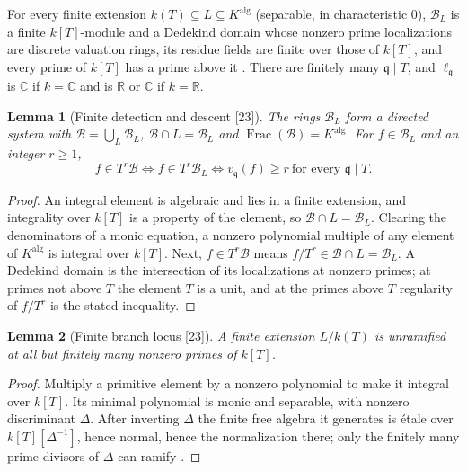 \documentclass[11pt,letterpaper]{article}
\numberwithin{equation}{section}
\newtheorem{lemma}[lemma]{Lemma}
\theoremstyle{definition}
\theoremstyle{remark}
\theoremstyle{plain}
\newcommand{\R}{\mathbb R}
\newcommand{\C}{\mathbb C}
\newcommand{\Frac}{\operatorname{Frac}}
\newcommand{\src}[1]{\textup{\textsf{[#1]}}}
\begin{document}
For every finite extension $k(T)\subseteq L\subseteq K^{\mathrm{alg}}$ (separable, in characteristic $0$), $\mathscr B_L$ is a finite $k[T]$-module and a
Dedekind domain whose nonzero prime localizations are discrete valuation rings, its residue fields are finite over those of $k[T]$, and every prime of
$k[T]$ has a prime above it \cite{StacksIntClosure,StacksDedekind,Sutherland}. There are finitely many $\mathfrak q\mid T$, and $\ell_{\mathfrak q}$ is
$\C$ if $k=\C$ and is $\R$ or $\C$ if $k=\R$.

\begin{lemma}[Finite detection and descent \src{23}]\label{osq:rm:lem:finite}
The rings $\mathscr B_L$ form a directed system with $\mathscr B=\bigcup_L\mathscr B_L$, $\mathscr B\cap L=\mathscr B_L$ and $\Frac(\mathscr B)=K^{\mathrm{alg}}$.
For $f\in\mathscr B_L$ and an integer $r\ge1$,
\begin{equation}\label{osq:rm:eq:finitetest}
 f\in T^r\mathscr B\iff f\in T^r\mathscr B_L\iff v_{\mathfrak q}(f)\ge r\ \text{for every }\mathfrak q\mid T .
\end{equation}
\end{lemma}
\begin{proof}
An integral element is algebraic and lies in a finite extension, and integrality over $k[T]$ is a property of the element, so $\mathscr B\cap L=\mathscr B_L$.
Clearing the denominators of a monic equation, a nonzero polynomial multiple of any element of $K^{\mathrm{alg}}$ is integral over $k[T]$. Next,
$f\in T^r\mathscr B$ means $f/T^r\in\mathscr B\cap L=\mathscr B_L$. A Dedekind domain is the intersection of its localizations at nonzero primes; at primes
not above $T$ the element $T$ is a unit, and at the primes above $T$ regularity of $f/T^r$ is the stated inequality.
\end{proof}

\begin{lemma}[Finite branch locus \src{23}]\label{osq:rm:lem:branchlocus}
A finite extension $L/k(T)$ is unramified at all but finitely many nonzero primes of $k[T]$.
\end{lemma}
\begin{proof}
Multiply a primitive element by a nonzero polynomial to make it integral over $k[T]$. Its minimal polynomial is monic and separable, with nonzero
discriminant $\Delta$. After inverting $\Delta$ the finite free algebra it generates is \'etale over $k[T][\Delta^{-1}]$, hence normal, hence the
normalization there; only the finitely many prime divisors of $\Delta$ can ramify \cite{StacksRamification}.
\end{proof}
\end{document}
